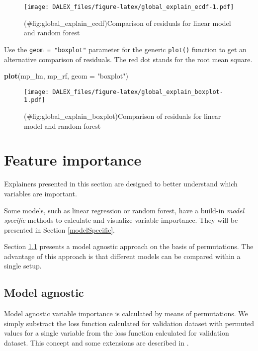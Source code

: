 \documentclass[]{book}
\newenvironment{Shaded}{\begin{snugshade}}{\end{snugshade}}
\newcommand{\DataTypeTok}[1]{\textcolor[rgb]{0.13,0.29,0.53}{#1}}
\newcommand{\KeywordTok}[1]{\textcolor[rgb]{0.13,0.29,0.53}{\textbf{#1}}}
\newcommand{\NormalTok}[1]{#1}
\newcommand{\StringTok}[1]{\textcolor[rgb]{0.31,0.60,0.02}{#1}}
\theoremstyle{definition}
\theoremstyle{definition}
\theoremstyle{definition}
\theoremstyle{remark}
\begin{document}
\begin{figure}
\centering
\texttt{[image: DALEX\_files/figure-latex/global\_explain\_ecdf-1.pdf]}
\caption{(\#fig:global\_explain\_ecdf)Comparison of residuals for linear
model and random forest}
\end{figure}

Use the \texttt{geom\ =\ "boxplot"} parameter for the generic
\texttt{plot()} function to get an alternative comparison of residuals.
The red dot stands for the root mean square.

\begin{Shaded}
\begin{Highlighting}[]
\KeywordTok{plot}\NormalTok{(mp_lm, mp_rf, }\DataTypeTok{geom =} \StringTok{"boxplot"}\NormalTok{)}
\end{Highlighting}
\end{Shaded}

\begin{figure}
\centering
\texttt{[image: DALEX\_files/figure-latex/global\_explain\_boxplot-1.pdf]}
\caption{(\#fig:global\_explain\_boxplot)Comparison of residuals for
linear model and random forest}
\end{figure}

\hypertarget{featureImportance}{%
\section{Feature importance}\label{featureImportance}}

Explainers presented in this section are designed to better understand
which variables are important.

Some models, such as linear regression or random forest, have a build-in
\emph{model specific} methods to calculate and visualize variable
importance. They will be presented in Section \ref{modelSpecific}.

Section \ref{modelAgnostic} presents a model agnostic approach on the
basis of permutations. The advantage of this approach is that different
models can be compared within a single setup.

\hypertarget{modelAgnostic}{%
\subsection{Model agnostic}\label{modelAgnostic}}

Model agnostic variable importance is calculated by means of
permutations. We simply substract the loss function calculated for
validation dataset with permuted values for a single variable from the
loss function calculated for validation dataset. This concept and some
extensions are described in \citep{variableImportancePermutations}.
\end{document}
